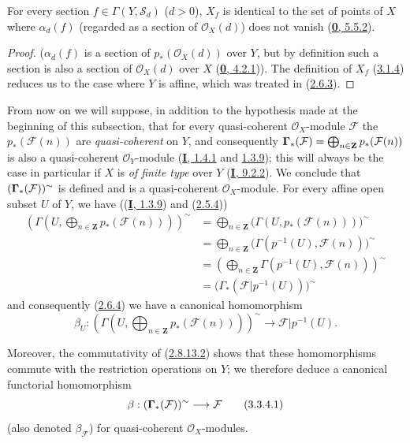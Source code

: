 \begin{proposition}[3.3.3]
\label{II.3.3.3}
For every section $f\in\Gamma(Y,\mathcal{S}_d)$ ($d>0$), $X_f$ is identical
to the set of points of $X$ where $\alpha_d(f)$ (regarded as a section of
$\mathcal{O}_X(d)$) does not vanish
\textup{(\hyperref[0.5.5.2]{\textbf{0}, 5.5.2})}.
\end{proposition}

\begin{proof}
($\alpha_d(f)$ is a section of $p_*(\mathcal{O}_X(d))$ over $Y$, but by
definition such a section is also a section of $\mathcal{O}_X(d)$ over $X$
(\hyperref[0.4.2.1]{\textbf{0}, 4.2.1})). The definition of $X_f$
(\hyperref[II.3.1.4]{3.1.4}) reduces us to the case where $Y$ is affine,
which was treated in (\hyperref[II.2.6.3]{2.6.3}).
\end{proof}

\begin{env}[3.3.4]
\label{II.3.3.4}
From now on we will suppose, in addition to the hypothesis made at the
beginning of this subsection, that for every quasi-coherent
$\mathcal{O}_X$-module $\mathcal{F}$ the $p_*(\mathcal{F}(n))$ are
\emph{quasi-coherent} on $Y$, and consequently
$\boldsymbol{\Gamma}_*(\mathcal{F})=\bigoplus_{n\in\mathbf{Z}}p_*(\mathcal{F}(n))$ is
also a quasi-coherent $\mathcal{O}_Y$-module
(\hyperref[I.1.4.1]{\textbf{I}, 1.4.1} and
\hyperref[I.1.3.9]{1.3.9}); this will always be the case in particular
if $X$ is \emph{of finite type} over $Y$
(\hyperref[I.9.2.2]{\textbf{I}, 9.2.2}). We conclude that
$(\boldsymbol{\Gamma}_*(\mathcal{F}))^{\sim}$ is defined and is a quasi-coherent
$\mathcal{O}_X$-module. For every affine open subset $U$ of $Y$, we
have ((\hyperref[I.1.3.9]{\textbf{I}, 1.3.9}) and
(\hyperref[II.2.5.4]{2.5.4}))
\begin{align*}
  \left(\Gamma\left(U,\bigoplus_{n\in\mathbf{Z}}
  p_*(\mathcal{F}(n))\right)\right)^{\sim}
  &=\bigoplus_{n\in\mathbf{Z}}
  \bigl(\Gamma(U,p_*(\mathcal{F}(n)))\bigr)^{\sim}\\
  &=\bigoplus_{n\in\mathbf{Z}}
  \bigl(\Gamma(p^{-1}(U),\mathcal{F}(n))\bigr)^{\sim}\\
  &=\left(\bigoplus_{n\in\mathbf{Z}}
  \Gamma(p^{-1}(U),\mathcal{F}(n))\right)^{\sim}\\
  &=\bigl(\Gamma_*(\mathcal{F}|p^{-1}(U))\bigr)^{\sim}
\end{align*}
and consequently (\hyperref[II.2.6.4]{2.6.4}) we have a canonical
homomorphism
\[
  \beta_U:\left(\Gamma\left(U,\bigoplus_{n\in\mathbf{Z}}
  p_*(\mathcal{F}(n))\right)\right)^{\sim}
  \longrightarrow\mathcal{F}|p^{-1}(U).
\]

Moreover, the commutativity of
(\hyperref[II.2.8.13.2]{2.8.13.2}) shows that these homomorphisms commute
with the restriction operations on $Y$; we therefore deduce a canonical
functorial homomorphism
\[
\label{II.3.3.4.1}
  \beta:(\boldsymbol{\Gamma}_*(\mathcal{F}))^{\sim}\longrightarrow\mathcal{F}
\tag{3.3.4.1}
\]
(also denoted $\beta_{\mathcal{F}}$) for quasi-coherent
$\mathcal{O}_X$-modules.
\end{env}

